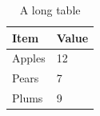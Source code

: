\documentclass{article}
\begin{document}
\begin{longtable}{ll}
\caption{A long table} \\
\hline
Item & Value \\
\hline
\endfirsthead
Apples & 12 \\
Pears & 7 \\
Plums & 9 \\
\hline
\end{longtable}
\end{document}
